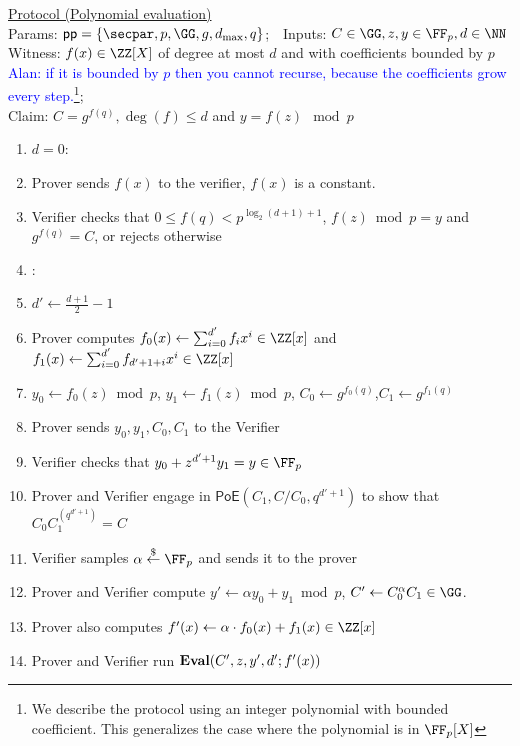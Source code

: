\documentclass{article}
\begin{document}
\begin{small}
 \begin{minipage}{1.1\textwidth}
\begin{mdframed}[userdefinedwidth=1\textwidth]  \label{prot:Opening}
	\noindent \underline{\textsf{Protocol \eval} (Polynomial evaluation)}\\
\noindent Params: $\crs=\{\secpar,p,\GG,g,d_{\max},q\}$;\ \
Inputs: $C\in \GG,z,y\in \FF_p,d \in \NN $\\
Witness: $f(x) \in \ZZ[X]$ of degree at most $d$ and with coefficients bounded by $p$ \textcolor{blue}{Alan: if it is bounded by $p$ then you cannot recurse, because the coefficients grow every step.}\footnote{We describe the protocol using an integer polynomial with bounded coefficient. This generalizes the case where the polynomial is in $\FF_p[X]$};\\ 
Claim: $C=g^{f(q)},\deg(f)\leq d$ and $y=f(z) \mod p$

\begin{enumerate}[nolistsep]
\item \pcif $d=0$:
\item \pcind[1] Prover sends $f(x)$ to the verifier, $f(x)$ is a constant. 
\item \pcind[1] Verifier checks that $0\leq f(q)<  p^{\log_2(d+1)+1}$,  $f(z) \bmod p=y$ and $g^{f(q)}=C$, or rejects otherwise 
\item \pcelse: 
\item \pcind[1] $d'\gets \frac{d+1}{2}-1$
\item \pcind[1] Prover computes $f_0(x)\gets\sum_{i=0}^{d'} f_i x^i\in \ZZ[x]$ and $f_1(x)\gets\sum_{i=0}^{d'} f_{d'+1+i} x^{i}\in \ZZ[x]$
\item \pcind[1] $y_0\gets f_0(z) \bmod p$, $y_1\gets f_1(z)\bmod p$, $C_0\gets g^{f_0(q)}$,$C_1\gets g^{f_1(q)}$
\item \pcind[1] Prover sends $y_0,y_1,C_0,C_1$ to the Verifier
\item \pcind[1] Verifier checks that $y_0+z^{d'+1} y_1=y\in \FF_p$ 
\item \pcind[1] Prover and Verifier engage in $\textsf{PoE}(C_1,C/C_0,q^{d'+1})$ to show that $C_0C_1^{(q^{d'+1})}=C$
\item \pcind[1] Verifier samples $\alpha \sample \FF_p$ and sends it to the prover
\item \pcind[1] Prover and Verifier compute $y'\gets\alpha y_0 +y_1 \bmod p$, $C'\gets C_0^{\alpha}C_1 \in \GG$. 
\item \pcind[1] Prover also computes $f'(x)\gets\alpha  \cdot f_0(x)+f_1(x) \in \ZZ[x]$ 
\item \pcind[1] Prover and Verifier run $\textbf{{Eval}}(C',z,y',d';f'(x))$
\end{enumerate}
\end{mdframed}
\end{minipage}
\end{small}
\end{document}
